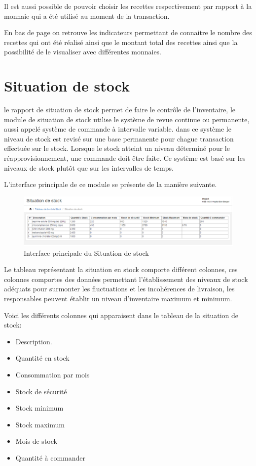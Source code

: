 \documentclass[12pt,a4paper]{report}
\begin{document}
Il est aussi possible de pouvoir choisir les recettes respectivement par rapport à la monnaie qui a été utilisé au moment de la transaction.

En bas de page on retrouve les indicateurs permettant de connaitre le nombre des recettes qui ont été réalisé ainsi que le montant total des recettes ainsi que la possibilité de le visualiser avec différentes monnaies. 


\newpage
\section{Situation de stock}
le rapport de situation de stock permet de faire le contrôle de l'inventaire, le module de situation de stock utilise le système de revue continue ou permanente, aussi appelé système de commande à intervalle variable. dans ce système le niveau de stock est revisé sur une base permanente pour chague transaction effectuée sur le stock. Lorsque le stock atteint un niveau déterminé pour le réapprovisionnement, une commande doit être faite. Ce système est basé sur les niveaux de stock plutôt que sur les intervalles de temps.

L'interface principale de ce module se présente de la manière suivante.

\begin{figure}[h]
\begin{center}
\includegraphics[width=14cm]{pic/SituationStock.png}
\end{center}
\caption{Interface principale du Situation de stock}
\label{Interface principale du Situation de stock}
\end{figure}

Le tableau représentant la situation en stock comporte différent colonnes, ces colonnes comportes des données permettant l'établissement des niveaux de stock adéquats pour surmonter les fluctuations et les incohérences de livraison, les responsables peuvent établir un niveau d'inventaire maximum et minimum.

Voici les différents colonnes qui apparaisent dans le tableau de la situation de stock:
\begin{itemize}
\item Description. 
\item Quantité en stock
\item Consommation par mois
\item Stock de sécurité
\item Stock minimum
\item Stock maximum
\item Mois de stock
\item Quantité à commander
\end{itemize}
\end{document}
